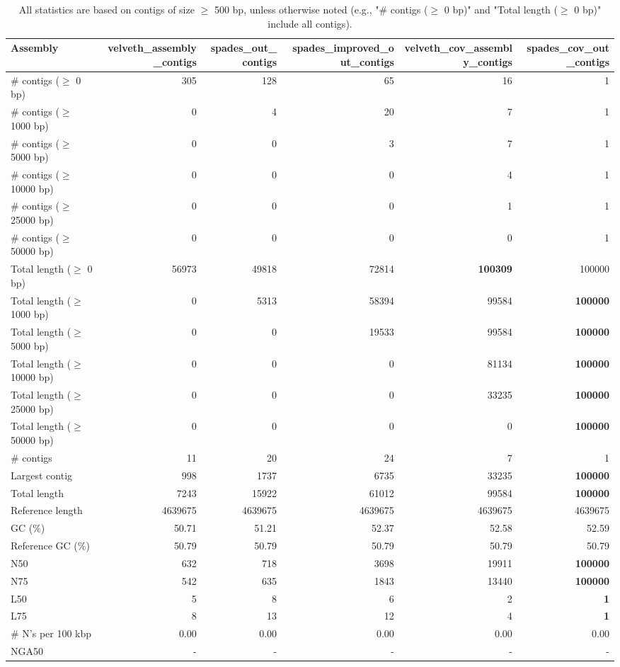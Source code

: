 \documentclass[12pt,a4paper]{article}
\begin{document}
\begin{table}[ht]
\begin{center}
\caption{All statistics are based on contigs of size $\geq$ 500 bp, unless otherwise noted (e.g., "\# contigs ($\geq$ 0 bp)" and "Total length ($\geq$ 0 bp)" include all contigs).}
\begin{tabular}{|l*{5}{|r}|}
\hline
Assembly & velveth\_assembly\_contigs & spades\_out\_contigs & spades\_improved\_out\_contigs & velveth\_cov\_assembly\_contigs & spades\_cov\_out\_contigs \\ \hline
\# contigs ($\geq$ 0 bp) & 305 & 128 & 65 & 16 & 1 \\ \hline
\# contigs ($\geq$ 1000 bp) & 0 & 4 & 20 & 7 & 1 \\ \hline
\# contigs ($\geq$ 5000 bp) & 0 & 0 & 3 & 7 & 1 \\ \hline
\# contigs ($\geq$ 10000 bp) & 0 & 0 & 0 & 4 & 1 \\ \hline
\# contigs ($\geq$ 25000 bp) & 0 & 0 & 0 & 1 & 1 \\ \hline
\# contigs ($\geq$ 50000 bp) & 0 & 0 & 0 & 0 & 1 \\ \hline
Total length ($\geq$ 0 bp) & 56973 & 49818 & 72814 & {\bf 100309} & 100000 \\ \hline
Total length ($\geq$ 1000 bp) & 0 & 5313 & 58394 & 99584 & {\bf 100000} \\ \hline
Total length ($\geq$ 5000 bp) & 0 & 0 & 19533 & 99584 & {\bf 100000} \\ \hline
Total length ($\geq$ 10000 bp) & 0 & 0 & 0 & 81134 & {\bf 100000} \\ \hline
Total length ($\geq$ 25000 bp) & 0 & 0 & 0 & 33235 & {\bf 100000} \\ \hline
Total length ($\geq$ 50000 bp) & 0 & 0 & 0 & 0 & {\bf 100000} \\ \hline
\# contigs & 11 & 20 & 24 & 7 & 1 \\ \hline
Largest contig & 998 & 1737 & 6735 & 33235 & {\bf 100000} \\ \hline
Total length & 7243 & 15922 & 61012 & 99584 & {\bf 100000} \\ \hline
Reference length & 4639675 & 4639675 & 4639675 & 4639675 & 4639675 \\ \hline
GC (\%) & 50.71 & 51.21 & 52.37 & 52.58 & 52.59 \\ \hline
Reference GC (\%) & 50.79 & 50.79 & 50.79 & 50.79 & 50.79 \\ \hline
N50 & 632 & 718 & 3698 & 19911 & {\bf 100000} \\ \hline
N75 & 542 & 635 & 1843 & 13440 & {\bf 100000} \\ \hline
L50 & 5 & 8 & 6 & 2 & {\bf 1} \\ \hline
L75 & 8 & 13 & 12 & 4 & {\bf 1} \\ \hline
\# N's per 100 kbp & 0.00 & 0.00 & 0.00 & 0.00 & 0.00 \\ \hline
NGA50 & - & - & - & - & - \\ \hline
\end{tabular}
\end{center}
\end{table}
\end{document}
